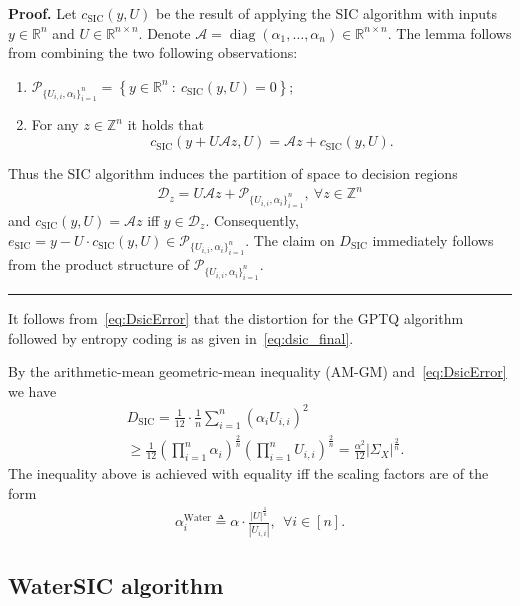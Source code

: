 \documentclass[journal]{IEEEtran}
\newcommand{\ZZ}{\mathbb{Z}}
\newcommand{\RR}{\mathbb{R}}
\newcommand{\diag}{\mathop{\mathrm{diag}}}
\newcommand{\m}{\mathcal}
\newenvironment{proof}[1][Proof]{\noindent\textbf{#1.} }{\ \rule{0.5em}{0.5em}}
\begin{document}
\begin{proof}
Let $c_{\mathrm{SIC}}(y,U)$ be the result of applying the SIC algorithm with inputs $y\in\RR^n$ and $U\in\RR^{n\times n}$. Denote $\m{A}=\diag(\alpha_1,\ldots,\alpha_n)\in\RR^{n\times n}$. The lemma follows from combining the two following observations:
\begin{enumerate}
\item $\m{P}_{\{U_{i,i},\alpha_i\}_{i=1}^n}=\left\{y\in\RR^n~:~c_{\mathrm{SIC}}(y,U)=0 \right\}$;
\item For any $z\in\ZZ^n$ it holds that $$c_{\mathrm{SIC}}(y+U \m{A} z,U)=\m{A}z+c_{\mathrm{SIC}}(y,U).$$
\end{enumerate}
Thus the SIC algorithm induces the partition of space to decision regions 
\begin{align}
\m{D}_{z}=U\m{A} z+\m{P}_{\{U_{i,i},\alpha_i\}_{i=1}^n},~\forall z\in\ZZ^n    
\end{align}
and $c_{\mathrm{SIC}}(y,U)=\m{A}z$ iff $y\in\m{D}_z$. Consequently, $e_{\mathrm{SIC}}=y-U\cdot c_{\mathrm{SIC}}(y,U)\in \m{P}_{\{U_{i,i},\alpha_i\}_{i=1}^n} $. The claim on $D_{\mathrm{SIC}}$ immediately follows from the product structure of $\m{P}_{\{U_{i,i},\alpha_i\}_{i=1}^n}$.
\end{proof}

It follows from~\eqref{eq:DsicError} that the distortion for the GPTQ algorithm followed by entropy coding is as given in~\eqref{eq:dsic_final}.

By the arithmetic-mean geometric-mean inequality (AM-GM) and~\eqref{eq:DsicError} we have
\begin{align}
&D_{\mathrm{SIC}}=\frac{1}{12}\cdot\frac{1}{n}\sum_{i=1}^n (\alpha_i U_{i,i})^2\nonumber\\
&\geq \frac{1}{12}\left(\prod_{i=1}^n{\alpha_i}\right)^{\frac{2}{n}}\left(\prod_{i=1}^n U_{i,i} \right)^{\frac{2}{n}} =\frac{\alpha^2}{12}|\Sigma_X|^{\frac{2}{n}}.
\label{eq:DsicBound}
\end{align}
The inequality above is achieved with equality iff the scaling factors are of the form
\begin{align}
\alpha_i^{\text{Water}}\triangleq \alpha\cdot \frac{|U|^{\frac{1}{n}}}{|U_{i,i}|},~~\forall i\in[n].
\label{eq:alphaAMGM}
\end{align}


\subsection{WaterSIC algorithm}
\label{sec:watersic}
\end{document}
